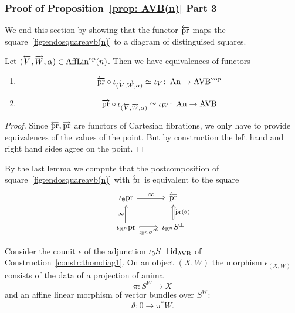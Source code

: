 \subsubsection{Proof of Proposition~\ref{prop: AVB(n)} Part 3}
We end this section by showing that the functor $\overleftarrow{\mathrm{pr}}$ maps the square~\ref{fig:endosquareavb(n)}
to a diagram of distinguised squares.

\begin{lemma}
    Let $(\overleftarrow{V},\overrightarrow{W},\alpha) \in \operatorname{AffLin}^{\mathrm{op}}(n)$. Then we have equivalences of functors 
    \begin{enumerate}
        \item \[
            \overleftarrow{\mathrm{pr}} \circ \iota_{(\overleftarrow{V},\overrightarrow{W},\alpha)} \simeq \iota_V \colon \operatorname{An} \to \operatorname{AVB}^{\mathrm{vop}}
        \]
        \item \[
            \overrightarrow{\mathrm{pr}} \circ \iota_{(\overleftarrow{V},\overrightarrow{W},\alpha)} \simeq \iota_W \colon \operatorname{An} \to \operatorname{AVB}
        \]
        
    \end{enumerate}
\label{lemma:iotasagree}
\end{lemma}
\begin{proof}
    Since $\overleftarrow{\mathrm{pr}},\overrightarrow{\mathrm{pr}}$ are functors of Cartesian fibrations, we only have to provide equivalences 
    of the values of the point.
    But by construction the left hand and right hand sides agree on the point. 
\end{proof}

By the last lemma we compute that the postcomposition of square~\ref{fig:endosquareavb(n)} with $\overleftarrow{\mathrm{pr}}$ is equivalent 
to the square 
\[\begin{tikzcd}
	{\iota_{\emptyset}\pr} & {\overleftarrow{\pr}} \\
	{\iota_{\R^n}\pr} & {\iota_{\R^n}S^\perp}
	\arrow["\infty", Rightarrow, from=2-1, to=1-1]
	\arrow["\infty", Rightarrow, from=1-1, to=1-2]
	\arrow["{\iota_{\R^n}\sigma^\infty}"', Rightarrow, from=2-1, to=2-2]
	\arrow["{\overleftarrow{\pr}(\theta)}"', Rightarrow, from=2-2, to=1-2]
\end{tikzcd}\]

Consider the counit $\epsilon$ of the adjunction $\iota_0 S \dashv \mathrm{id}_{\operatorname{AVB}}$ of Construction~\ref{constr:thomdiag1}.
On an object $(X,W)$ the morphism $\epsilon_{(X,W)}$ consists of the data of a projection of anima 
\[
\pi \colon S^W \to X    
\]
and an affine linear morphism of vector bundles over $S^W$:
\[
\vartheta \colon 0 \to \pi^*W.    
\]


